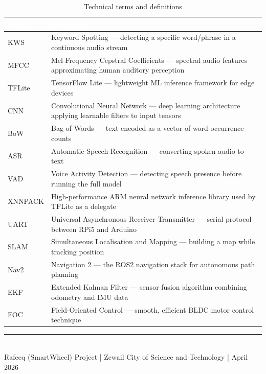 \documentclass[12pt, a4paper]{report}
\newcommand{\thead}[1]{%
  \cellcolor{tableheader}\textcolor{white}{\textbf{#1}}}
\newcommand{\trow}[1]{\rowcolor{rowalt}#1}
\begin{document}
\begin{table}[h!]
\centering
\caption{Technical terms and definitions}
\label{tab:glossary}
\begin{tabularx}{\textwidth}{lX}
\toprule
\thead{Term} & \thead{Definition} \\
\midrule
\trow{KWS}     & Keyword Spotting --- detecting a specific word/phrase in a continuous audio stream \\
MFCC           & Mel-Frequency Cepstral Coefficients --- spectral audio features approximating human auditory perception \\
\trow{TFLite}  & TensorFlow Lite --- lightweight ML inference framework for edge devices \\
CNN            & Convolutional Neural Network --- deep learning architecture applying learnable filters to input tensors \\
\trow{BoW}     & Bag-of-Words --- text encoded as a vector of word occurrence counts \\
ASR            & Automatic Speech Recognition --- converting spoken audio to text \\
\trow{VAD}     & Voice Activity Detection --- detecting speech presence before running the full model \\
XNNPACK        & High-performance ARM neural network inference library used by TFLite as a delegate \\
\trow{UART}    & Universal Asynchronous Receiver-Transmitter --- serial protocol between RPi5 and Arduino \\
SLAM           & Simultaneous Localisation and Mapping --- building a map while tracking position \\
\trow{Nav2}    & Navigation 2 --- the ROS2 navigation stack for autonomous path planning \\
EKF            & Extended Kalman Filter --- sensor fusion algorithm combining odometry and IMU data \\
\trow{FOC}     & Field-Oriented Control --- smooth, efficient BLDC motor control technique \\
\bottomrule
\end{tabularx}
\end{table}

\vfill
\begin{center}
  {\color{steelblue}\rule{0.6\textwidth}{1pt}}\\[6pt]
  {\small\color{darkgray}
    Rafeeq (SmartWheel) Project \quad|\quad
    Zewail City of Science and Technology \quad|\quad
    April 2026}
\end{center}
\end{document}
